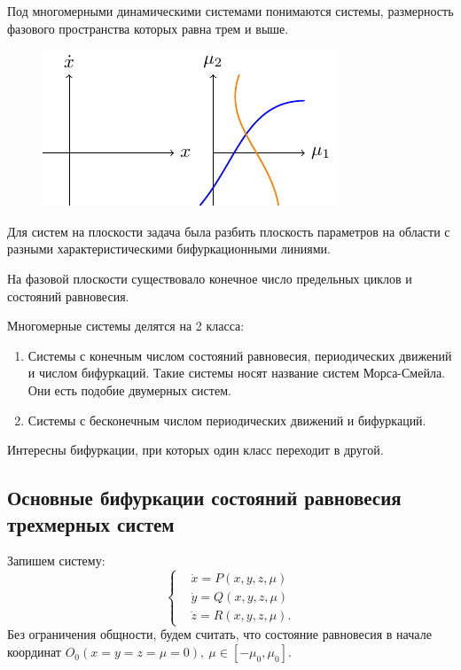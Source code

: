 Под многомерными динамическими системами понимаются системы, размерность фазового пространства которых равна трем и выше. 
\begin{figure}[H]
	\centering
	\includegraphics[scale=1.5]{img/multidimensional_dynamic_systems/mds.pdf}
\end{figure}
Для систем на плоскости задача была разбить плоскость параметров на области с разными характеристическими бифуркационными линиями.

На фазовой плоскости существовало конечное число предельных циклов и состояний равновесия.

Многомерные системы делятся на 2 класса:
\begin{enumerate}
	\item Системы с конечным числом состояний равновесия, периодических движений и числом бифуркаций. Такие системы носят название систем Морса-Смейла. Они есть подобие двумерных систем.
	\item Системы с бесконечным числом периодических движений и бифуркаций. 
\end{enumerate}

Интересны бифуркации, при которых один класс переходит в другой.

\subsection{Основные бифуркации состояний равновесия трехмерных систем}
Запишем систему:
\begin{equation}
	\left\{\begin{aligned}
		&\dot x = P(x, y, z, \mu) \\
		&\dot y = Q(x, y, z, \mu) \\
		&\dot z = R(x, y, z, \mu).
	\end{aligned}\right.
	\label{eq:107}	
\end{equation}
Без ограничения общности, будем считать, что состояние равновесия в начале координат $O_0(x=y=z=\mu=0),~\mu \in [-\mu_0,\mu_0]$.

